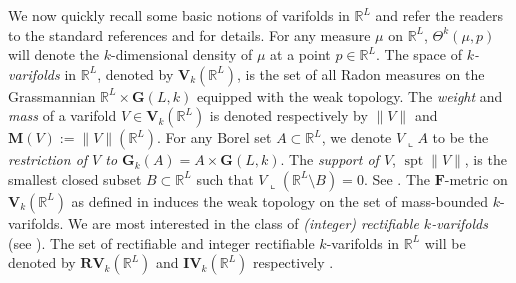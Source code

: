 \documentclass[10pt]{amsart}
\theoremstyle{definition}
\theoremstyle{remark}
\numberwithin{equation}{section}
\newcommand{\R}{\mathbb{R}}
\newcommand{\lc}{\llcorner}
\newcommand{\M}{\mathbf{M}}
\newcommand{\Gr}{\mathbf{G}}
\newcommand{\bV}{\mathbf{V}}
\newcommand{\bRV}{\mathbf{RV}}
\newcommand{\bIV}{\mathbf{IV}}
\newcommand{\mF}{\mathbf{F}}
\newcommand{\spt}{\operatorname{spt}}
\begin{document}
We now quickly recall some basic notions of varifolds in $\R^L$ and refer the readers to the standard references \cite{Allard72} and \cite{Simon} for details. 
For any measure $\mu$ on $\mathbb{R}^L$, $\Theta^k(\mu,p)$ will denote the $k$-dimensional density of $\mu$ at a point $p \in \R^L$.
The space of \emph{$k$-varifolds} in $\mathbb{R}^L$, denoted by $\bV_k(\mathbb{R}^L)$, is the set of all Radon measures on the Grassmannian $\mathbb{R}^L\times\Gr(L,k)$ equipped with the weak topology. The \emph{weight} and \emph{mass} of a varifold $V \in \bV_k(\mathbb{R}^L)$ is denoted respectively by $\|V\|$ and $\M(V):=\|V\|(\mathbb{R}^L)$. For any Borel set $A \subset \R^L$, we denote $V \lc A$ to be the \emph{restriction of $V$ to $\Gr_k(A)=A \times \Gr(L,k)$}. The \emph{support of $V$}, $\spt \|V\|$, is the smallest closed subset $B \subset \mathbb{R}^L$ such that $V\lc(\mathbb{R}^L \setminus B)=0$. See \cite[\S 38]{Simon}. The $\mF$-metric on $\bV_k(\mathbb{R}^L)$ as defined in \cite[2.1(19)]{Pitts} induces the weak topology on the set of mass-bounded $k$-varifolds. 
We are most interested in the class of \emph{(integer) rectifiable $k$-varifolds} (see \cite[Chapter 3 and 4]{Simon}). 
The set of rectifiable and integer rectifiable $k$-varifolds in $\mathbb{R}^L$ will be denoted by $\bRV_k(\mathbb{R}^L)$ and $\bIV_k(\mathbb{R}^L)$ respectively \cite[2.1(18)]{Pitts}. 
\end{document}
